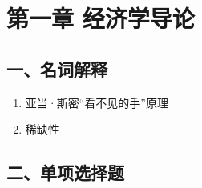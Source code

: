 \documentclass{article}
\begin{document}
\section*{第一章 经济学导论}

\subsection*{一、名词解释}
\begin{enumerate}[label={\arabic*.}]
    \item 亚当·斯密“看不见的手”原理
    \item 稀缺性
\end{enumerate}

\subsection*{二、单项选择题}
\end{document}
